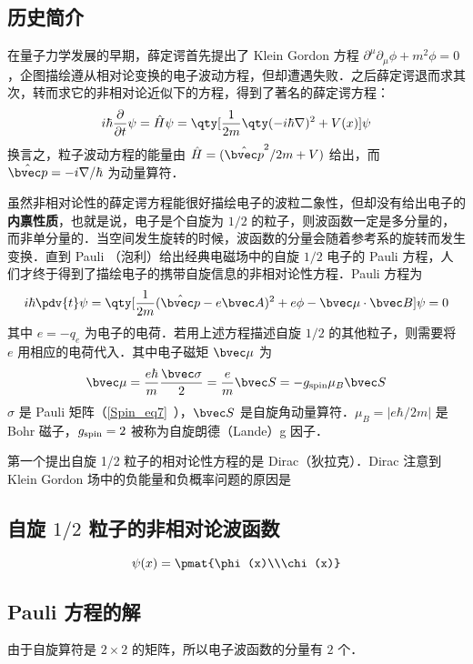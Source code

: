 
\subsection{历史简介}
在量子力学发展的早期，薛定谔首先提出了 Klein Gordon 方程 $\partial^\mu \partial_\mu \phi+m^2\phi=0$，企图描绘遵从相对论变换的电子波动方程，但却遭遇失败．之后薛定谔退而求其次，转而求它的非相对论近似下的方程，得到了著名的薛定谔方程：
\begin{equation}
i\hbar \frac{\partial }{\partial t}\psi = \hat H\psi=\qty[\frac{ 1}{2m}\qty(-i\hbar\nabla)^2+V(x)]\psi
\end{equation}
换言之，粒子波动方程的能量由 $\hat H=(\hat{\bvec p}^2/2m+V)$ 给出，而 $\hat{\bvec p}=-i\nabla/\hbar$ 为动量算符．

虽然非相对论性的薛定谔方程能很好描绘电子的波粒二象性，但却没有给出电子的\textbf{内禀性质}，也就是说，电子是个自旋为 $1/2$ 的粒子，则波函数一定是多分量的，而非单分量的．当空间发生旋转的时候，波函数的分量会随着参考系的旋转而发生变换．直到 Pauli （泡利）给出经典电磁场中的自旋 $1/2$ 电子的 Pauli 方程，人们才终于得到了描绘电子的携带自旋信息的非相对论性方程．Pauli 方程为
\begin{equation}
i\hbar\pdv{t} \psi=\qty[\frac{1}{2m}(\hat{\bvec p}-e\bvec A)^2+e\phi-\bvec \mu\cdot \bvec B]\psi = 0
\end{equation}
其中 $e=-q_e$ 为电子的电荷．若用上述方程描述自旋 $1/2$ 的其他粒子，则需要将 $e$ 用相应的电荷代入．其中电子磁矩 $\bvec \mu$ 为
\begin{equation}
\bvec \mu = \frac{e\hbar}{m}\frac{\bvec \sigma}{2}=\frac{e}{m}\bvec S=-g_{\rm spin}\mu_B \bvec S
\end{equation}
$\sigma$ 是 Pauli 矩阵（\autoref{Spin_eq7}~），$\bvec S$ 是自旋角动量算符．$\mu_B=|e\hbar/2m|$ 是 Bohr 磁子，$g_{\rm spin}=2$ 被称为自旋朗德（Lande）g 因子．

第一个提出自旋 1/2 粒子的相对论性方程的是 Dirac（狄拉克）．Dirac 注意到 Klein Gordon 场中的负能量和负概率问题的原因是


\subsection{自旋 $1/2$ 粒子的非相对论波函数}
\begin{equation}
\psi(x)=\pmat{\phi(x)\\\chi(x)}
\end{equation}

\subsection{Pauli 方程的解}
由于自旋算符是 $2\times 2$ 的矩阵，所以电子波函数的分量有 $2$ 个．